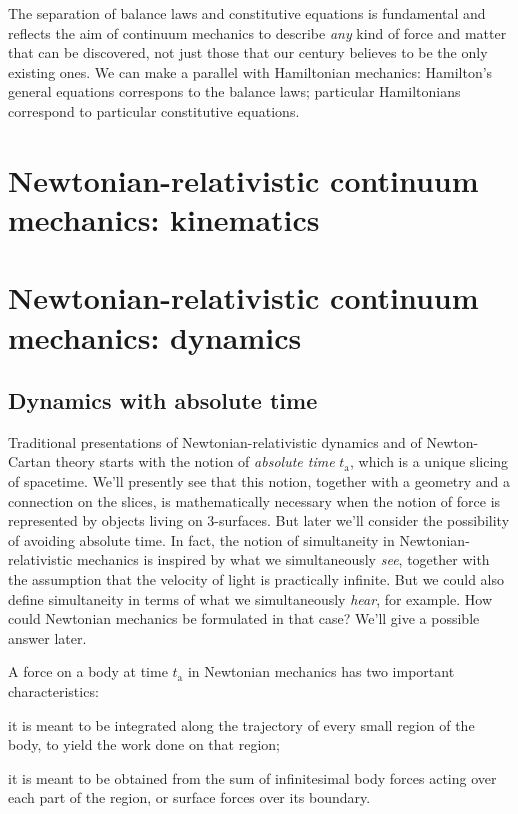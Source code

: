 \documentclass[\ifafour a4paper,12pt,\else a5paper,10pt,\fi%
onecolumn,oneside,article,%
british%
]{memoir}
\theoremstyle{remark}
\theoremstyle{innote}
\renewcommand*{\|}[1][]{\nonscript\,#1\vert\nonscript\;\mathopen{}}
\newcommand*{\ytn}{t_{\textrm{a}}}
\begin{document}
The separation of balance laws and constitutive equations is fundamental
and reflects the aim of continuum mechanics to describe \emph{any} kind of
force and matter that can be discovered, not just those that our century
believes to be the only existing ones. We can make a parallel with
Hamiltonian mechanics: Hamilton's general equations correspons to the
balance laws; particular Hamiltonians correspond to particular constitutive
equations.



\section{Newtonian-relativistic continuum mechanics: kinematics}
\label{sec:newton_kinematics}


\section{Newtonian-relativistic continuum mechanics: dynamics}
\label{sec:newton_dynamics}

\subsection{Dynamics with absolute time}
\label{sec:newton_dynamics_absolute_time}

Traditional presentations of Newtonian-relativistic dynamics and of
Newton-Cartan theory starts with the notion of \emph{absolute time} $\ytn$,
which is a unique slicing of spacetime. We'll presently see that this
notion, together with a geometry and a connection on the slices, is
mathematically necessary when the notion of force is represented by objects
living on 3-surfaces. But later we'll consider the possibility of avoiding
absolute time. In fact, the notion of simultaneity in
Newtonian-relativistic mechanics is inspired by what we simultaneously
\emph{see}, together with the assumption that the velocity of light is
practically infinite. But we could also define simultaneity in terms of
what we simultaneously \emph{hear}, for example. How could Newtonian
mechanics be formulated in that case? We'll give a possible answer later.

A force on a body at time $\ytn$ in Newtonian mechanics has two important
characteristics:
\begin{enumerate*}[label=(\arabic*)]
\item it is meant to be integrated along the trajectory of every small
  region of the body, to yield the work done on that region;
\item it is meant to be obtained from the sum of infinitesimal body forces
  acting over each part of the region, or surface forces over its boundary.
\end{enumerate*}
\end{document}

